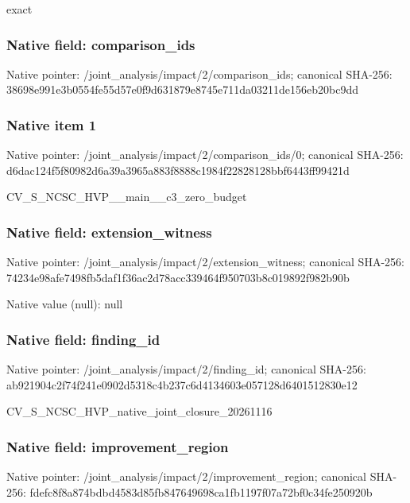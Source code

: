\documentclass[10pt,a4paper]{article}
\begin{document}
\begingroup\raggedright\sloppy exact\par\endgroup

\subsubsection{Native field: comparison\_\allowbreak{}ids}
Native pointer: /joint\_\allowbreak{}analysis/impact/2/comparison\_\allowbreak{}ids; canonical SHA-256: 38698e991e3b0554fe55d57e0f9d631879e8745e711da03211de156eb20bc9dd

\subsubsection{Native item 1}
Native pointer: /joint\_\allowbreak{}analysis/impact/2/comparison\_\allowbreak{}ids/0; canonical SHA-256: d6dac124f5f80982d6a39a3965a883f8888c1984f22828128bbf6443ff99421d

\begingroup\raggedright\sloppy CV\_\allowbreak{}S\_\allowbreak{}NCSC\_\allowbreak{}HVP\_\allowbreak{}\_\allowbreak{}main\_\allowbreak{}\_\allowbreak{}c3\_\allowbreak{}zero\_\allowbreak{}budget\par\endgroup

\subsubsection{Native field: extension\_\allowbreak{}witness}
Native pointer: /joint\_\allowbreak{}analysis/impact/2/extension\_\allowbreak{}witness; canonical SHA-256: 74234e98afe7498fb5daf1f36ac2d78acc339464f950703b8c019892f982b90b

Native value (null): null

\subsubsection{Native field: finding\_\allowbreak{}id}
Native pointer: /joint\_\allowbreak{}analysis/impact/2/finding\_\allowbreak{}id; canonical SHA-256: ab921904c2f74f241e0902d5318c4b237c6d4134603e057128d6401512830e12

\begingroup\raggedright\sloppy CV\_\allowbreak{}S\_\allowbreak{}NCSC\_\allowbreak{}HVP\_\allowbreak{}native\_\allowbreak{}joint\_\allowbreak{}closure\_\allowbreak{}20261116\par\endgroup

\subsubsection{Native field: improvement\_\allowbreak{}region}
Native pointer: /joint\_\allowbreak{}analysis/impact/2/improvement\_\allowbreak{}region; canonical SHA-256: fdefc8f8a874bdbd4583d85fb847649698ca1fb1197f07a72bf0c34fe250920b
\end{document}

